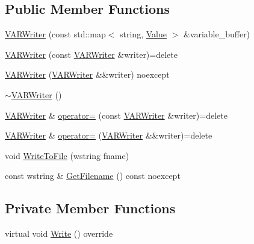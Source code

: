 \subsection*{Public Member Functions}
\begin{DoxyCompactItemize}
\item 
\mbox{\hyperlink{classmage_1_1loader_1_1_v_a_r_writer_af9b9e552dc77446790bbd52390b42582}{V\+A\+R\+Writer}} (const std\+::map$<$ string, \mbox{\hyperlink{namespacemage_aa1fe0628487e0706e44efdc62dbdb3a2}{Value}} $>$ \&variable\+\_\+buffer)
\item 
\mbox{\hyperlink{classmage_1_1loader_1_1_v_a_r_writer_a5ddb3fcd75952ecc8593bc284dc3db0e}{V\+A\+R\+Writer}} (const \mbox{\hyperlink{classmage_1_1loader_1_1_v_a_r_writer}{V\+A\+R\+Writer}} \&writer)=delete
\item 
\mbox{\hyperlink{classmage_1_1loader_1_1_v_a_r_writer_ab8a676252c909a6f8914d786048de255}{V\+A\+R\+Writer}} (\mbox{\hyperlink{classmage_1_1loader_1_1_v_a_r_writer}{V\+A\+R\+Writer}} \&\&writer) noexcept
\item 
\mbox{\hyperlink{classmage_1_1loader_1_1_v_a_r_writer_af908fe01c6754dabec6ed3c45b852b3b}{$\sim$\+V\+A\+R\+Writer}} ()
\item 
\mbox{\hyperlink{classmage_1_1loader_1_1_v_a_r_writer}{V\+A\+R\+Writer}} \& \mbox{\hyperlink{classmage_1_1loader_1_1_v_a_r_writer_a6ffe21455dfc82f8d829d9cabe59ba53}{operator=}} (const \mbox{\hyperlink{classmage_1_1loader_1_1_v_a_r_writer}{V\+A\+R\+Writer}} \&writer)=delete
\item 
\mbox{\hyperlink{classmage_1_1loader_1_1_v_a_r_writer}{V\+A\+R\+Writer}} \& \mbox{\hyperlink{classmage_1_1loader_1_1_v_a_r_writer_aef0efc3b6d9ca8c0da5e45063da01365}{operator=}} (\mbox{\hyperlink{classmage_1_1loader_1_1_v_a_r_writer}{V\+A\+R\+Writer}} \&\&writer)=delete
\item 
void \mbox{\hyperlink{classmage_1_1loader_1_1_v_a_r_writer_a9af5416468b0a51983d07aec8061eb27}{Write\+To\+File}} (wstring fname)
\item 
const wstring \& \mbox{\hyperlink{classmage_1_1loader_1_1_v_a_r_writer_aedbc8d5fa02444ecba2e040ca8e98281}{Get\+Filename}} () const noexcept
\end{DoxyCompactItemize}
\subsection*{Private Member Functions}
\begin{DoxyCompactItemize}
\item 
virtual void \mbox{\hyperlink{classmage_1_1loader_1_1_v_a_r_writer_af2bbf94353f1b4b01aa56e8dd9c89d7f}{Write}} () override
\end{DoxyCompactItemize}

